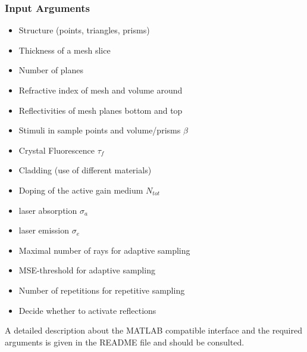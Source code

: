 \subsubsection{Input Arguments}
\begin{description}
  \label{label:input}
  \item[Mesh information]\mbox{}
    \begin{itemize}
      \setlength{\itemindent}{-2.5em}
    \item Structure (points, triangles, prisms)
    \item Thickness of a mesh slice 
    \item Number of planes
    \item Refractive index of mesh and volume around
    \item Reflectivities of mesh planes bottom and top
    \end{itemize}

  \item[Properties]
    \mbox{}
    \begin{itemize}
      \setlength{\itemindent}{-2.5em}
      \item Stimuli in sample points and volume/prisms $\beta$
      \item Crystal Fluorescence $\tau_{f}$
      \item Cladding (use of different materials)
      \item Doping of the active gain medium $N_{tot}$
    \end{itemize}

  \item[Laser information]
    \mbox{}
    \begin{itemize}
      \setlength{\itemindent}{-2.5em}
      \item laser absorption $\sigma_a$
      \item laser emission $\sigma_e$
    \end{itemize}

   \item[Algorithm information]
    \mbox{}
    \begin{itemize}
      \setlength{\itemindent}{-2.5em}
       \item Maximal number of rays for adaptive sampling
       \item MSE-threshold for adaptive sampling
       \item Number of repetitions for repetitive sampling
       \item Decide whether to activate reflections
     \end{itemize}
    
 \end{description}
A detailed description about the MATLAB compatible interface
and the required arguments is given in the README file 
and should be consulted.

